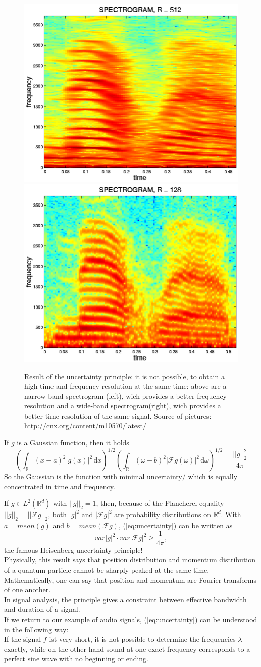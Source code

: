 \documentclass[a4paper, 11pt]{scrreprt}
\newcommand{\RR}{\mathbb{R}}
\newcommand{\FF}{\mathcal{F}}
\newcommand{\student}[1]{\marginnote{{\normalfont\bf #1}}}
\begin{document}
\begin{figure}[htpb]
\student{Dominik}	
	\centering
	\includegraphics[height=0.40\textwidth]{Narrow-band-spectrogram.png}
	\includegraphics[height=0.40\textwidth]{Wide-band-spectrogram.png}
	\caption{Result of the uncertainty principle: it is not possible, to obtain a high time and frequency resolution at the same time: above are a narrow-band spectrogram (left), wich provides a better frequency resolution and a wide-band spectrogram(right), wich provides a better time resolution of the same signal. Source of pictures: http://cnx.org/content/m10570/latest/} 
\end{figure} 
If \(g\) is a Gaussian function, then it holds 
	\[\left(\int_{\RR} (x-a)^2|g(x)|^2 \,\mathrm{d}x\right)^{1/2} \left(\int_{\RR}(\omega-b)^2|\FF g(\omega)|^2\,\mathrm{d}\omega\right)^{1/2} = \frac{||g||_2^2}{4\pi}\]
So the Gaussian is the function with minimal uncertainty/  which is equally concentrated in time and frequency.
\newpage

If \(g\in L^2(\RR^d)\) with \(||g||_2=1\), then, because of the Plancherel equality \(||g||_2=||\FF g||_2\), both \(|g|^2\) and \(|\FF g|^2\) are probability distributions on \(\RR^d\). With \(a=mean(g)\) and \(b=mean(\FF g)\), (\ref{eq:uncertainty}) can be written as
	\[var|g|^2 \cdot var|\FF g|^2 \geq \frac{1}{4\pi},\]
the famous Heisenberg uncertainty principle!\\	
Physically, this result says that position distribution and momentum distribution of a quantum particle cannot be sharply peaked at the same time. Mathematically, one can say that position and momentum are Fourier transforms of one another.\\
In signal analysis, the principle gives a constraint between effective bandwidth and duration of a signal.\\
If we return to our example of audio signals, (\ref{eq:uncertainty}) can be understood in the following way:\\
If the signal \(f\) ist very short, it is not possible to determine the frequencies \(\lambda\) exactly, while on the other hand sound at one exact frequency corresponds to a perfect sine wave with no beginning or ending.
\end{document}
